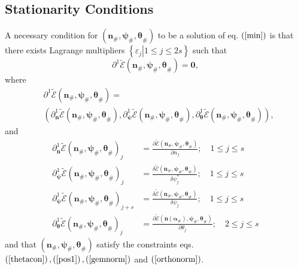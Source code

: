\documentclass[aps,preprint]{revtex4}%
\begin{document}
\subsection{Stationarity Conditions}

A necessary condition for $\left(  \mathbf{n}_{\#}\mathbf{,\psi}%
_{\#}\mathbf{,\theta}_{\#}\right)  $ to be a solution of eq. $\left(
\ref{min}\right)  $ is that there exists Lagrange multipliers $\left\{
\left.  \varepsilon_{j}\right\vert 1\leq j\leq2s\right\}  $ such that
\begin{equation}
\partial^{1}\mathcal{\tilde{E}}\left(  \mathbf{n}_{\#}\mathbf{,\psi}%
_{\#}\mathbf{,\theta}_{\#}\right)  =\mathbf{0,}%
\end{equation}
where
\begin{align}
&  \left.  \partial^{1}\mathcal{\tilde{E}}\left(  \mathbf{n}_{\#}%
\mathbf{,\psi}_{\#}\mathbf{,\theta}_{\#}\right)  \right.  =\nonumber\\
&  \left(  \partial_{\mathbf{n}}^{1}\mathcal{\tilde{E}}\left(  \mathbf{n}%
_{\#}\mathbf{,\psi}_{\#}\mathbf{,\theta}_{\#}\right)  ,\partial_{\mathbf{\psi
}}^{1}\mathcal{\tilde{E}}\left(  \mathbf{n}_{\#}\mathbf{,\psi}_{\#}%
\mathbf{,\theta}_{\#}\right)  ,\partial_{\mathbf{\theta}}^{1}\mathcal{\tilde
{E}}\left(  \mathbf{n}_{\#}\mathbf{,\psi}_{\#}\mathbf{,\theta}_{\#}\right)
\right)  ,
\end{align}
and
\begin{align}
\partial_{\mathbf{n}}^{1}\mathcal{\tilde{E}}\left(  \mathbf{n}_{\#}%
\mathbf{,\psi}_{\#}\mathbf{,\theta}_{\#}\right)  _{j}  &  =\frac
{\partial\mathcal{\tilde{E}}\left(  \mathbf{n}_{\#}\mathbf{,\psi}%
_{\#}\mathbf{,\theta}_{\#}\right)  }{\partial n_{j}};\quad1\leq j\leq
s\nonumber\\
\partial_{\mathbf{\psi}}^{1}\mathcal{\tilde{E}}\left(  \mathbf{n}%
_{\#}\mathbf{,\psi}_{\#}\mathbf{,\theta}_{\#}\right)  _{j}  &  =\frac
{\delta\mathcal{\tilde{E}}\left(  \mathbf{n}_{\#}\mathbf{,\psi}_{\#}%
\mathbf{,\theta}_{\#}\right)  }{\delta\psi_{j}^{\ast}};\quad1\leq j\leq
s\nonumber\\
\partial_{\mathbf{\psi}}^{1}\mathcal{\tilde{E}}\left(  \mathbf{n}%
_{\#}\mathbf{,\psi}_{\#}\mathbf{,\theta}_{\#}\right)  _{j+s}  &  =\frac
{\delta\mathcal{\tilde{E}}\left(  \mathbf{n}_{\#}\mathbf{,\psi}_{\#}%
\mathbf{,\theta}_{\#}\right)  }{\delta\psi_{j}};\quad1\leq j\leq s\nonumber\\
\partial_{\mathbf{\theta}}^{1}\mathcal{\tilde{E}}\left(  \mathbf{n}%
_{\#}\mathbf{,\psi}_{\#}\mathbf{,\theta}_{\#}\right)  _{j}  &  =\frac
{\partial\mathcal{\tilde{E}}\left(  \mathbf{n}\left(  \mathbf{\alpha}%
_{\#}\right)  \mathbf{,\psi}_{\#}\mathbf{,\theta}_{\#}\right)  }%
{\partial\theta_{j}};\quad2\leq j\leq s
\end{align}
and that $\left(  \mathbf{n}_{\#}\mathbf{,\psi}_{\#}\mathbf{,\theta}%
_{\#}\right)  $ satisfy the constraints eqs. $\left(  \ref{thetacon}\right)
,\left(  \ref{pos1}\right)  ,\left(  \ref{gemnorm}\right)  $ and $\left(
\ref{orthonorm}\right)  $.
\end{document}
